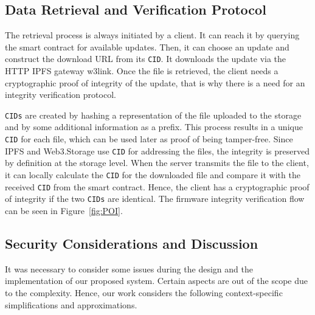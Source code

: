 \documentclass[conference]{IEEEtran}
\begin{document}
\subsection{Data Retrieval and Verification Protocol}

The retrieval process is always initiated by a client. It can reach it by querying the smart contract for available updates. Then, it can choose an update and construct the download URL from its \texttt{CID}. It downloads the update via the HTTP IPFS gateway w3link. Once the file is retrieved, the client needs a cryptographic proof of integrity of the update, that is why there is a need for an integrity verification protocol.

\texttt{CIDs} are created by hashing a representation of the file uploaded to the storage and by some additional information as a prefix. This process results in a unique \texttt{CID} for each file, which can be used later as proof of being tamper-free. Since IPFS and Web3.Storage use \texttt{CID} for addressing the files, the integrity is preserved by definition at the storage level. When the server transmits the file to the client, it can locally calculate the \texttt{CID} for the downloaded file and compare it with the received \texttt{CID} from the smart contract. Hence, the client has a cryptographic proof of integrity if the two \texttt{CIDs} are identical. The firmware integrity verification flow can be seen in Figure~\ref{fig:POI}.



\subsection{Security Considerations and Discussion}

It was necessary to consider some issues during the design and the implementation of our proposed system. Certain aspects are out of the scope due to the complexity. Hence, our work considers the following context-specific simplifications and approximations.
\end{document}
